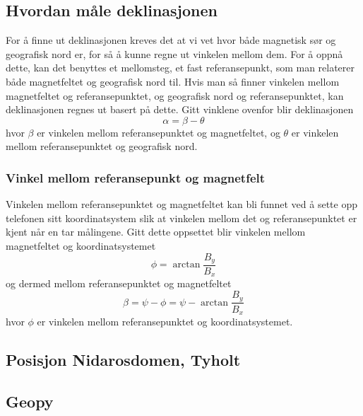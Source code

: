 \subsection{Hvordan måle deklinasjonen}
For å finne ut deklinasjonen kreves det at vi vet hvor både magnetisk sør og 
geografisk nord er, for så å kunne regne ut vinkelen mellom dem. For å oppnå dette, 
kan det benyttes et mellomsteg, et fast referansepunkt, som man relaterer både 
magnetfeltet og geografisk nord til. Hvis man så finner vinkelen mellom magnetfeltet 
og referansepunktet, og geografisk nord og referansepunktet, kan deklinasjonen 
regnes ut basert på dette. Gitt vinklene ovenfor blir deklinasjonen
\begin{equation}
    \alpha = \beta - \theta
\end{equation}
hvor $\beta$ er vinkelen mellom referansepunktet og magnetfeltet, og $\theta$ er 
vinkelen mellom referansepunktet og geografisk nord.

\subsubsection{Vinkel mellom referansepunkt og magnetfelt}
Vinkelen mellom referansepunktet og magnetfeltet kan bli funnet ved å sette opp 
telefonen sitt koordinatsystem slik at vinkelen mellom det og referansepunktet er 
kjent når en tar målingene. Gitt dette oppsettet blir vinkelen mellom magnetfeltet 
og koordinatsystemet
\begin{equation}
    \phi = \arctan \frac{B_y}{B_x}
\end{equation}
og dermed mellom referansepunktet og magnetfeltet
\begin{equation}
    \beta = \psi - \phi = \psi - \arctan \frac{B_y}{B_x}
\end{equation}
hvor $\phi$ er vinkelen mellom referansepunktet og koordinatsystemet.

\subsection{Posisjon Nidarosdomen, Tyholt}

\subsection{Geopy}

